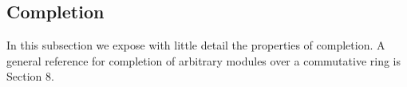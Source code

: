 \subsection{Completion}
In this subsection we expose with little detail the properties of completion. A general reference for completion of arbitrary modules over a commutative ring is \cite{Matsumura} Section 8. 
%
